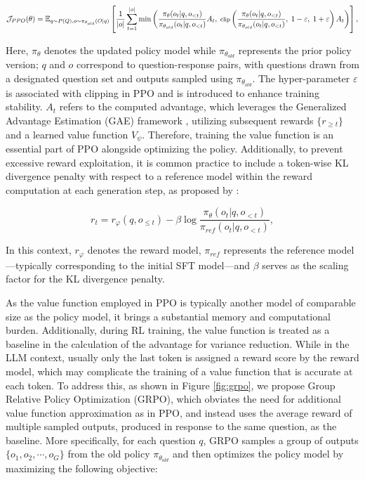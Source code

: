 \begin{itemize}[topsep=0pt]
\begin{itemize}[topsep=0pt]
\begin{equation}
\footnotesize
    \mathcal{J}_{PPO}(\theta) = \mathbb{E}_{q \sim P(Q), o \sim \pi_{\theta_{old}}(O|q)} \left[ \frac{1}{|o|} \sum_{t=1}^{|o|} \min \left( \frac{\pi_\theta(o_{t} | q, o_{<t})}{\pi_{\theta_{old}}(o_{t} | q, o_{<t})} A_{t}, \ \text{clip} \left( \frac{\pi_\theta(o_{t} | q, o_{<t})}{\pi_{\theta_{old}}(o_{t} | q, o_{<t})},\ 1 - \varepsilon,\ 1 + \varepsilon \right)  A_{t} \right) \right],
\end{equation}

Here, $\pi_{\theta}$ denotes the updated policy model while $\pi_{\theta_{old}}$ represents the prior policy version; $q$ and $o$ correspond to question-response pairs, with questions drawn from a designated question set and outputs sampled using $\pi_{\theta_{old}}$. The hyper-parameter $\varepsilon$ is associated with clipping in PPO and is introduced to enhance training stability. $A_t$ refers to the computed advantage, which leverages the Generalized Advantage Estimation (GAE) framework \citep{gae}, utilizing subsequent rewards $\{r_{\ge t}\}$ and a learned value function $V_{\psi}$. Therefore, training the value function is an essential part of PPO alongside optimizing the policy. Additionally, to prevent excessive reward exploitation, it is common practice to include a token-wise KL divergence penalty with respect to a reference model within the reward computation at each generation step, as proposed by \citep{ouyang2022training}:

\begin{equation}
    r_{t} = r_\varphi(q, o_{\le t}) - \beta \log\frac{\pi_{\theta}(o_{t}|q, o_{<t})}{\pi_{ref}(o_{t}|q, o_{<t})},
\label{eq:PPO-reward}
\end{equation}

In this context, $r_\varphi$ denotes the reward model, $\pi_{ref}$ represents the reference model—typically corresponding to the initial SFT model—and $\beta$ serves as the scaling factor for the KL divergence penalty.

As the value function employed in PPO is typically another model of comparable size as the policy model, it brings a substantial memory and computational burden. Additionally, during RL training, the value function is treated as a baseline in the calculation of the advantage for variance reduction. While in the LLM context, usually only the last token is assigned a reward score by the reward model, which may complicate the training of a value function that is accurate at each token. To address this, as shown in Figure \ref{fig:grpo}, we propose Group Relative Policy Optimization (GRPO), which obviates the need for additional value function approximation as in PPO, and instead uses the average reward of multiple sampled outputs, produced in response to the same question, as the baseline. More specifically, for each question $q$, GRPO samples a group of outputs $\{o_1, o_2, \cdots, o_G\}$  from the old policy  $\pi_{\theta_{old}}$  and then optimizes the policy model by maximizing the following objective:


\end{itemize}
\end{itemize}

